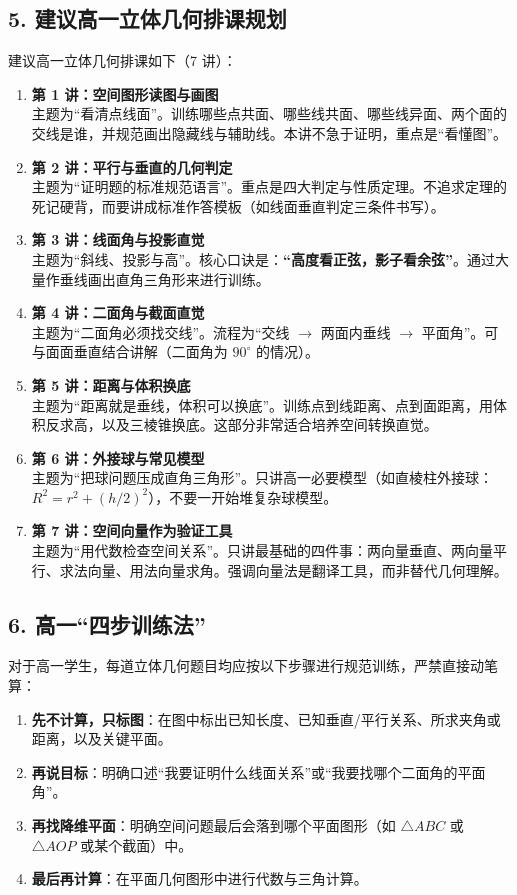 \documentclass[11pt,a4paper]{ctexart}
\begin{document}
\subsection*{5. 建议高一立体几何排课规划}
建议高一立体几何排课如下（7 讲）：
\begin{enumerate}
  \item \textbf{第 1 讲：空间图形读图与画图} \\
    主题为“看清点线面”。训练哪些点共面、哪些线共面、哪些线异面、两个面的交线是谁，并规范画出隐藏线与辅助线。本讲不急于证明，重点是“看懂图”。
  \item \textbf{第 2 讲：平行与垂直的几何判定} \\
    主题为“证明题的标准规范语言”。重点是四大判定与性质定理。不追求定理的死记硬背，而要讲成标准作答模板（如线面垂直判定三条件书写）。
  \item \textbf{第 3 讲：线面角与投影直觉} \\
    主题为“斜线、投影与高”。核心口诀是：\textbf{“高度看正弦，影子看余弦”}。通过大量作垂线画出直角三角形来进行训练。
  \item \textbf{第 4 讲：二面角与截面直觉} \\
    主题为“二面角必须找交线”。流程为“交线 $\rightarrow$ 两面内垂线 $\rightarrow$ 平面角”。可与面面垂直结合讲解（二面角为 $90^\circ$ 的情况）。
  \item \textbf{第 5 讲：距离与体积换底} \\
    主题为“距离就是垂线，体积可以换底”。训练点到线距离、点到面距离，用体积反求高，以及三棱锥换底。这部分非常适合培养空间转换直觉。
  \item \textbf{第 6 讲：外接球与常见模型} \\
    主题为“把球问题压成直角三角形”。只讲高一必要模型（如直棱柱外接球：$R^2 = r^2 + (h/2)^2$），不要一开始堆复杂球模型。
  \item \textbf{第 7 讲：空间向量作为验证工具} \\
    主题为“用代数检查空间关系”。只讲最基础的四件事：两向量垂直、两向量平行、求法向量、用法向量求角。强调向量法是翻译工具，而非替代几何理解。
\end{enumerate}

\subsection*{6. 高一“四步训练法”}
对于高一学生，每道立体几何题目均应按以下步骤进行规范训练，严禁直接动笔算：
\begin{enumerate}
  \item \textbf{先不计算，只标图}：在图中标出已知长度、已知垂直/平行关系、所求夹角或距离，以及关键平面。
  \item \textbf{再说目标}：明确口述“我要证明什么线面关系”或“我要找哪个二面角的平面角”。
  \item \textbf{再找降维平面}：明确空间问题最后会落到哪个平面图形（如 $\triangle ABC$ 或 $\triangle AOP$ 或某个截面）中。
  \item \textbf{最后再计算}：在平面几何图形中进行代数与三角计算。
\end{enumerate}
\end{document}

